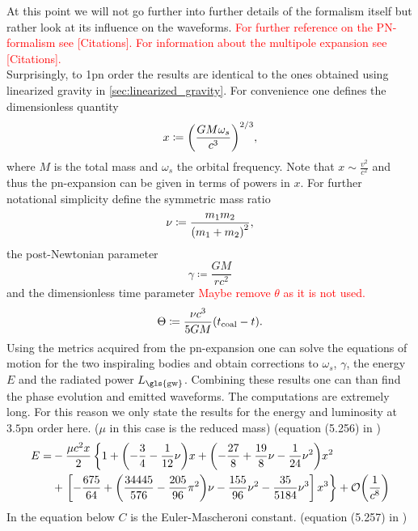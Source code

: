 At this point we will not go further into further details of the formalism itself but rather look at its influence on the waveforms. \textcolor{red}{For further reference on the PN-formalism see [Citations]. For information about the multipole expansion see [Citations].}\medskip\\
Surprisingly, to 1\gls{pn} order the results are identical to the ones obtained using linearized gravity in \autoref{sec:linearized_gravity}. For convenience one defines the dimensionless quantity
\begin{equation}
x\coloneqq {\left( \frac{G M \omega_s}{c^3} \right)}^{2/3},
\end{equation}
where $M$ is the total mass and $\omega_s$ the orbital frequency. Note that $x\sim \frac{v^2}{c^2}$ and thus the \gls{pn}-expansion can be given in terms of powers in $x$. For further notational simplicity define the symmetric mass ratio
\begin{equation}
\nu\coloneqq \frac{m_1 m_2}{{\left( m_1 + m_2 \right)}^2},
\end{equation}
the post-Newtonian parameter
\begin{equation}
\gamma\coloneqq \frac{G M}{r c^2}
\end{equation}
and the dimensionless time parameter \textcolor{red}{Maybe remove $\theta$ as it is not used.}
\begin{equation}
\Theta\coloneqq \frac{\nu c^3}{5 G M}{\left( t_\text{coal}-t \right)}.
\end{equation}
Using the metrics acquired from the \gls{pn}-expansion one can solve the equations of motion for the two inspiraling bodies and obtain corrections to $\omega_s$, $\gamma$, the energy $E$ and the radiated power $L_\text{\gls{gw}}$. Combining these results one can than find the phase evolution and emitted waveforms. The computations are extremely long. For this reason we only state the results for the energy and luminosity at $3.5$\gls{pn} order here. ($\mu$ in this case is the reduced mass) (equation (5.256) in \cite{gwv1})
\begin{align}
E= & -\frac{\mu c^2 x}{2}\left\{ 1+{\left( -\frac{3}{4}-\frac{1}{12}\nu \right)}x+{\left( -\frac{27}{8}+\frac{19}{8}\nu-\frac{1}{24}\nu^2 \right)}x^2\right.\nonumber\\
& +\left. \left[ -\frac{675}{64}+{\left( \frac{34445}{576}-\frac{205}{96}\pi^2 \right)}\nu -\frac{155}{96}\nu^2 - \frac{35}{5184}\nu^3\right] x^3\right\}+\mathcal{O}{\left( \frac{1}{c^8} \right)}
\end{align}
In the equation below $C$ is the Euler-Mascheroni constant. (equation (5.257) in \cite{gwv1})
